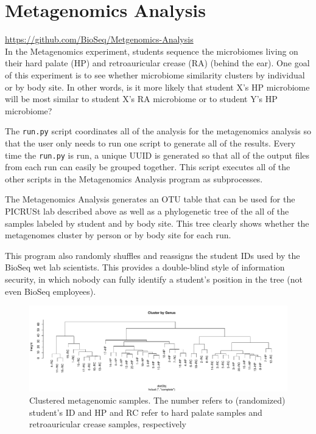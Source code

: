 \documentclass{report}
\begin{document}
\section{Metagenomics Analysis}
\url{https://github.com/BioSeq/Metgenomics-Analysis}\\

\noindent In the Metagenomics experiment, students sequence the microbiomes living on their hard palate (HP) and retroauricular crease (RA) (behind the ear). One goal of this experiment is to see whether microbiome similarity clusters by individual or by body site. In other words, is it more likely that student X's HP microbiome will be most similar to student X's RA microbiome or to student Y's HP microbiome?

The \texttt{run.py} script coordinates all of the analysis for the metagenomics analysis so that the user only needs to run one script to generate all of the results. Every time the \texttt{run.py} is run, a unique UUID is generated so that all of the output files from each run can easily be grouped together. This script executes all of the other scripts in the Metagenomics Analysis program as subprocesses.

The Metagenomics Analysis generates an OTU table that can be used for the PICRUSt lab described above as well as a phylogenetic tree of the all of the samples labeled by student and by body site. This tree clearly shows whether the metagenomes cluster by person or by body site for each run. 

This program also randomly shuffles and reassigns the student IDs used by the BioSeq wet lab scientists. This provides a double-blind style of information security, in which nobody can fully identify a student's position in the tree (not even BioSeq employees). 

\begin{figure}[h]
\includegraphics[width=\linewidth]{tree.pdf}
\caption{Clustered metagenomic samples. The number refers to (randomized) student's ID and HP and RC refer to hard palate samples and retroauricular crease samples, respectively}
\end{figure}
\end{document}
